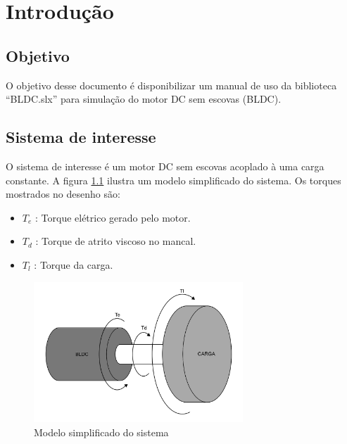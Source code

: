 \chapter{Introdução}

    \section{Objetivo}
        O objetivo desse documento é disponibilizar um manual de uso da biblioteca ``BLDC.slx'' para simulação do motor DC sem escovas (BLDC).

    \section{Sistema de interesse}
        O sistema de interesse é um motor DC sem escovas acoplado à uma carga constante. A figura \ref{fig_modelo_simplificado} ilustra um modelo simplificado do sistema. Os torques mostrados no desenho são:
        \begin{itemize}
            \item $T_e$ : Torque elétrico gerado pelo motor.
            \item $T_d$ : Torque de atrito viscoso no mancal.
            \item $T_l$ : Torque da carga.
        \end{itemize}

        \begin{figure}[ht]
            \centering
            \includegraphics[width=0.7\textwidth]{sketch_bldc}
            \caption{Modelo simplificado do sistema}
            \label{fig_modelo_simplificado}
        \end{figure}

